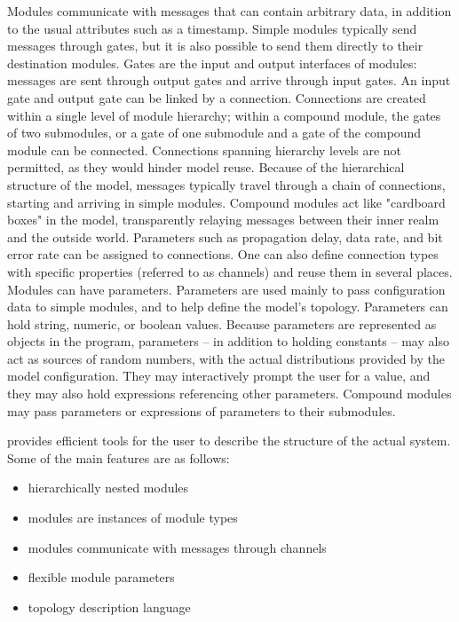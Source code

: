 Modules communicate with messages that can contain arbitrary
data, in addition to the usual attributes such as a timestamp.
Simple modules typically send messages through gates, but it is also
possible to send them directly to their destination modules. Gates are the
input and output interfaces of modules: messages are sent through
output gates and arrive through input gates. An input gate and output gate
can be linked by a connection. Connections are created within a single
level of module hierarchy; within a compound module, the gates of
two submodules, or a gate of one submodule and a gate of the compound
module can be connected. Connections spanning hierarchy levels are
not permitted, as they would hinder model reuse. Because of the hierarchical
structure of the model, messages typically travel through a chain of
connections, starting and arriving in simple modules. Compound modules act like
"cardboard boxes" in the model, transparently relaying messages between
their inner realm and the outside world. Parameters such as propagation delay,
data rate, and bit error rate can be assigned to connections. One can also
define connection types with specific properties (referred to as channels) and
reuse them in several places. Modules can have parameters. Parameters are
used mainly to pass configuration data to simple modules, and to help
define the model's topology. Parameters can hold string, numeric, or boolean
values. Because parameters are represented as objects in the program,
parameters -- in addition to holding constants -- may also act as
sources of random numbers, with the actual distributions provided by the
model configuration. They may interactively prompt the user for a value,
and they may also hold expressions referencing other parameters. Compound
modules may pass parameters or expressions of parameters to their
submodules.


{\opp} provides efficient tools for the user to describe the
structure of the actual system. Some of the main features are as follows:

\begin{itemize}
\item hierarchically nested modules
\item modules are instances of module types
\item modules communicate with messages through channels
\item flexible module parameters
\item topology description language
\end{itemize}

